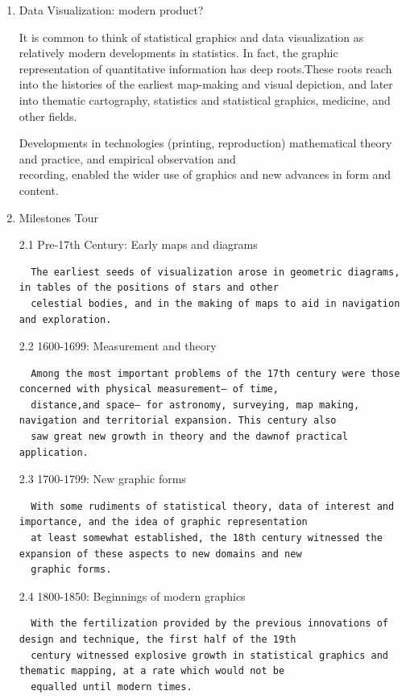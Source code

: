 \documentclass[]{book}
\theoremstyle{definition}
\theoremstyle{definition}
\theoremstyle{definition}
\theoremstyle{remark}
\begin{document}
\begin{enumerate}
\def\labelenumi{\arabic{enumi}.}
\item
  Data Visualization: modern product?

  It is common to think of statistical graphics and data visualization
  as relatively modern developments in statistics. In fact, the graphic
  representation of quantitative information has deep roots.These roots
  reach into the histories of the earliest map-making and visual
  depiction, and later into thematic cartography, statistics and
  statistical graphics, medicine, and other fields.

  Developments in technologies (printing, reproduction) mathematical
  theory and practice, and empirical observation and\\
  recording, enabled the wider use of graphics and new advances in form
  and content.
\item
  Milestones Tour

  2.1 Pre-17th Century: Early maps and diagrams

\begin{verbatim}
  The earliest seeds of visualization arose in geometric diagrams, in tables of the positions of stars and other
  celestial bodies, and in the making of maps to aid in navigation and exploration. 
\end{verbatim}

  2.2 1600-1699: Measurement and theory

\begin{verbatim}
  Among the most important problems of the 17th century were those concerned with physical measurement— of time,
  distance,and space— for astronomy, surveying, map making, navigation and territorial expansion. This century also
  saw great new growth in theory and the dawnof practical application.
\end{verbatim}

  2.3 1700-1799: New graphic forms

\begin{verbatim}
  With some rudiments of statistical theory, data of interest and importance, and the idea of graphic representation
  at least somewhat established, the 18th century witnessed the expansion of these aspects to new domains and new
  graphic forms. 
\end{verbatim}

  2.4 1800-1850: Beginnings of modern graphics

\begin{verbatim}
  With the fertilization provided by the previous innovations of design and technique, the first half of the 19th
  century witnessed explosive growth in statistical graphics and thematic mapping, at a rate which would not be
  equalled until modern times.
\end{verbatim}


\end{enumerate}
\end{document}
